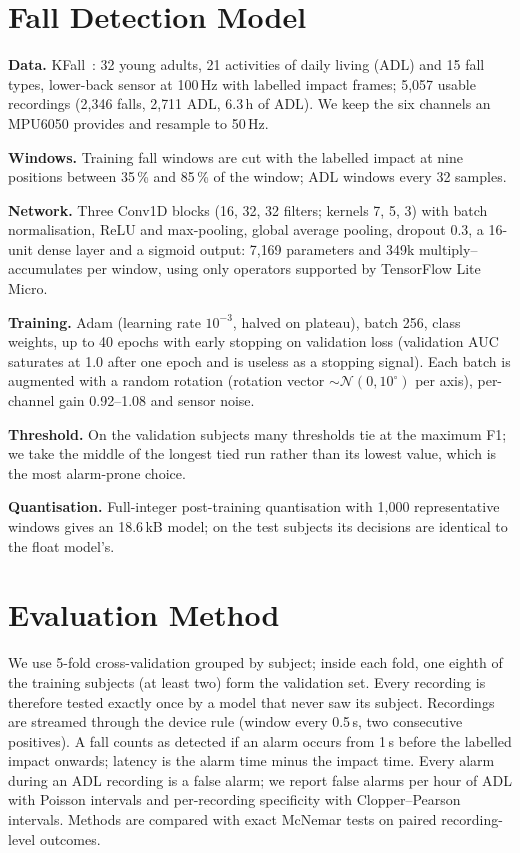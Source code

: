 \documentclass[conference]{IEEEtran}
\begin{document}
\section{Fall Detection Model}
\textbf{Data.} KFall~\cite{yu2021kfall}: 32 young adults, 21 activities of daily living
(ADL) and 15 fall types, lower-back sensor at 100\,Hz with labelled impact frames; 5{,}057
usable recordings (2{,}346 falls, 2{,}711 ADL, 6.3\,h of ADL). We keep the six channels
an MPU6050 provides and resample to 50\,Hz.

\textbf{Windows.} Training fall windows are cut with the labelled impact at nine
positions between 35\,\% and 85\,\% of the window; ADL windows every 32 samples.

\textbf{Network.} Three Conv1D blocks (16, 32, 32 filters; kernels 7, 5, 3) with batch
normalisation, ReLU and max-pooling, global average pooling, dropout 0.3, a 16-unit dense
layer and a sigmoid output: 7{,}169 parameters and 349k multiply--accumulates per window,
using only operators supported by TensorFlow Lite Micro.

\textbf{Training.} Adam (learning rate $10^{-3}$, halved on plateau), batch 256, class
weights, up to 40 epochs with early stopping on validation loss (validation AUC saturates
at 1.0 after one epoch and is useless as a stopping signal). Each batch is augmented with a
random rotation (rotation vector $\sim\mathcal{N}(0, 10^\circ)$ per axis), per-channel gain
0.92--1.08 and sensor noise.

\textbf{Threshold.} On the validation subjects many thresholds tie at the maximum F1;
we take the middle of the longest tied run rather than its lowest value, which is the most
alarm-prone choice.

\textbf{Quantisation.} Full-integer post-training quantisation with 1{,}000
representative windows gives an 18.6\,kB model; on the test subjects its decisions are
identical to the float model's.

\section{Evaluation Method}
We use 5-fold cross-validation grouped by subject; inside each fold, one eighth of the
training subjects (at least two) form the validation set. Every recording is therefore
tested exactly once by a model that never saw its subject. Recordings are streamed through
the device rule (window every 0.5\,s, two consecutive positives). A fall counts as detected
if an alarm occurs from 1\,s before the labelled impact onwards; latency is the alarm time
minus the impact time. Every alarm during an ADL recording is a false alarm; we report
false alarms per hour of ADL with Poisson intervals and per-recording specificity with
Clopper--Pearson intervals. Methods are compared with exact McNemar tests on paired
recording-level outcomes.
\end{document}
